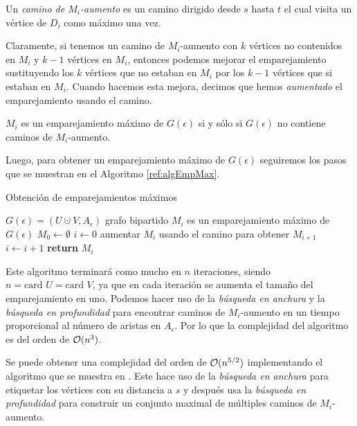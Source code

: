 \begin{definition}
Un \emph{camino de $M_i$-aumento} es un camino dirigido desde $s$ hasta $t$ el cual visita un vértice de $D_i$ como máximo una vez.
\end{definition}

Claramente, si tenemos un camino de $M_i$-aumento con $k$ vértices no contenidos en $M_i$ y $k-1$ vértices en $M_i$, entonces podemos mejorar el emparejamiento sustituyendo los $k$ vértices que no estaban en $M_i$ por los $k-1$ vértices que si estaban en $M_i$. Cuando hacemos esta mejora, decimos que hemos \emph{aumentado} el emparejamiento usando el camino. 

\begin{lemma}
$M_i$ es un emparejamiento máximo de $G(\epsilon)$ si y sólo si $G(\epsilon)$ no contiene caminos de $M_i$-aumento.
\end{lemma}

Luego, para obtener un emparejamiento máximo de $G(\epsilon)$ seguiremos los pasos que se muestran en el Algoritmo \ref{ref:algEmpMax}.

\begin{algorithm}[!ht]
\caption{Obtención de emparejamientos máximos}\label{ref:algEmpMax}
\begin{algorithmic}[1]
\Require $G(\epsilon)=(U \cupdot V, A_\epsilon)$ grafo bipartido
\Ensure $M_i$ es un emparejamiento máximo de $G(\epsilon)$
\State $M_0\gets \emptyset$
\State $i\gets 0$
	\State aumentar $M_i$ usando el camino para obtener $M_{i+1}$
	\State $i\gets i+1$
\EndWhile
\State \textbf{return} $M_i$
\end{algorithmic}
\end{algorithm}

Este algoritmo terminará como mucho en $n$ iteraciones, siendo $n= \text{card } U = \text{card } V$, ya que en cada iteración se aumenta el tamaño del emparejamiento en uno. Podemos hacer uso de la \emph{búsqueda en anchura} y la \emph{búsqueda en profundidad} para encontrar caminos de $M_i$-aumento en un tiempo proporcional al número de aristas en $A_\epsilon$. Por lo que la complejidad del algoritmo es del orden de $\mathcal{O}(n^3)$.

Se puede obtener una complejidad del orden de $\mathcal{O}(n^{5/2})$ implementando el algoritmo que se muestra en \cite[Chapter~8]{libroEH}. Este hace uso de la \emph{búsqueda en anchura} para etiquetar los vértices con su distancia a $s$ y después usa la \emph{búsqueda en profundidad} para construir un conjunto maximal de múltiples caminos de $M_i$-aumento.  

